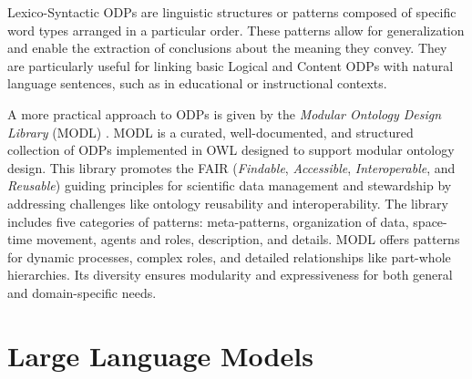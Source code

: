 Lexico-Syntactic ODPs are linguistic structures or patterns composed of specific word types arranged in a particular order.
These patterns allow for generalization and enable the extraction of conclusions about the meaning they convey.
They are particularly useful for linking basic Logical and Content ODPs with natural language sentences, such as in educational or instructional contexts.

A more practical approach to ODPs is given by the \textit{Modular Ontology Design Library} (MODL) \cite{shimizu2019modl}.
MODL is a curated, well-documented, and structured collection of ODPs implemented in OWL designed to support modular ontology design.
This library promotes the FAIR (\textit{Findable}, \textit{Accessible}, \textit{Interoperable}, and \textit{Reusable}) guiding principles for scientific data management and stewardship by addressing challenges like ontology reusability and interoperability.
The library includes five categories of patterns: meta-patterns, organization of data, space-time movement, agents and roles, description, and details.
MODL offers patterns for dynamic processes, complex roles, and detailed relationships like part-whole hierarchies.
Its diversity ensures modularity and expressiveness for both general and domain-specific needs.

\section{Large Language Models}
\label{section:2_3_llms}
